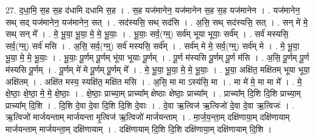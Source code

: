 \documentclass[17pt]{extarticle}
\begin{document}
27. द॒धा॒मि॒ स॒ह स॒ह द॑धामि दधामि स॒ह । . स॒ह यज॑मानेन॒ यज॑मानेन स॒ह स॒ह यज॑मानेन । . यज॑मानेन॒ सथ् सद् यज॑मानेन॒ यज॑मानेन॒ सत् । . सद॑स्यसि॒ सथ् सद॑सि । . अ॒सि॒ सथ् सद॑स्यसि॒ सत् । . सन् मे॑ मे॒ सथ् सन् मे᳚ । . मे॒ भू॒या॒ भू॒या॒ मे॒ मे॒ भू॒याः॒ । . भू॒याः॒ सर्व॒(ग्म्॒) सर्व॑म् भूया भूयाः॒ सर्व᳚म् । . सर्व॑ मस्यसि॒ सर्व॒(ग्म्॒) सर्व॑ मसि । . अ॒सि॒ सर्व॒(ग्म्॒) सर्व॑ मस्यसि॒ सर्व᳚म् । . सर्व॑म् मे मे॒ सर्व॒(ग्म्॒) सर्व॑म् मे । . मे॒ भू॒या॒ भू॒या॒ मे॒ मे॒ भू॒याः॒ । . भू॒याः॒ पू॒र्णम् पू॒र्णम् भू॑या भूयाः पू॒र्णम् । . पू॒र्ण म॑स्यसि पू॒र्णम् पू॒र्ण म॑सि । . अ॒सि॒ पू॒र्णम् पू॒र्ण म॑स्यसि पू॒र्णम् । . पू॒र्णम् मे॑ मे पू॒र्णम् पू॒र्णम् मे᳚ । . मे॒ भू॒या॒ भू॒या॒ मे॒ मे॒ भू॒याः॒ । . भू॒या॒ अक्षि॑त॒ मक्षि॑तम् भूया भूया॒ अक्षि॑तम् । . अक्षि॑त मस्य॒ स्यक्षि॑त॒ मक्षि॑त मसि । . अ॒सि॒ मा मा ऽस्य॑सि॒ मा । . मा मे॑ मे॒ मा मा मे᳚ । . मे॒ क्षे॒ष्ठाः॒ क्षे॒ष्ठा॒ मे॒ मे॒ क्षे॒ष्ठाः॒ । . क्षे॒ष्ठाः॒ प्राच्या॒म् प्राच्या᳚म् क्षेष्ठाः क्षेष्ठाः॒ प्राच्या᳚म् । . प्राच्या᳚म् दि॒शि दि॒शि प्राच्या॒म् प्राच्या᳚म् दि॒शि । . दि॒शि दे॒वा दे॒वा दि॒शि दि॒शि दे॒वाः । . दे॒वा ऋ॒त्विज॑ ऋ॒त्विजो॑ दे॒वा दे॒वा ऋ॒त्विजः॑ । . ऋ॒त्विजो॑ मार्जयन्ताम् मार्जयन्ता मृ॒त्विज॑ ऋ॒त्विजो॑ मार्जयन्ताम् । . मा॒र्ज॒य॒न्ता॒म् दक्षि॑णाया॒म् दक्षि॑णायाम् मार्जयन्ताम् मार्जयन्ता॒म् दक्षि॑णायाम् । . दक्षि॑णायाम् दि॒शि दि॒शि दक्षि॑णाया॒म् दक्षि॑णायाम् दि॒शि । \newline
\end{document}
